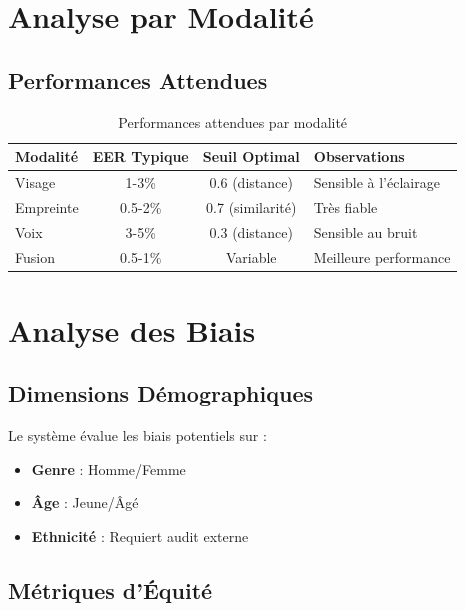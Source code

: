 \documentclass[12pt,a4paper]{report}
\begin{document}
\section{Analyse par Modalité}

\subsection{Performances Attendues}

\begin{table}[H]
    \centering
    \caption{Performances attendues par modalité}
    \label{tab:perf-modalite}
    \begin{tabular}{|l|c|c|l|}
        \hline
        \textbf{Modalité} & \textbf{EER Typique} & \textbf{Seuil Optimal} & \textbf{Observations} \\
        \hline
        Visage & 1-3\% & 0.6 (distance) & Sensible à l'éclairage \\
        \hline
        Empreinte & 0.5-2\% & 0.7 (similarité) & Très fiable \\
        \hline
        Voix & 3-5\% & 0.3 (distance) & Sensible au bruit \\
        \hline
        Fusion & 0.5-1\% & Variable & Meilleure performance \\
        \hline
    \end{tabular}
\end{table}

\section{Analyse des Biais}

\subsection{Dimensions Démographiques}

Le système évalue les biais potentiels sur :
\begin{itemize}
    \item \textbf{Genre} : Homme/Femme
    \item \textbf{Âge} : Jeune/Âgé
    \item \textbf{Ethnicité} : Requiert audit externe
\end{itemize}

\subsection{Métriques d'Équité}
\end{document}
